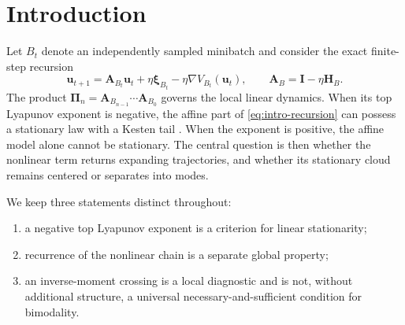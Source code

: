 \documentclass[11pt]{article}
\theoremstyle{definition}
\newcommand{\Id}{\mathbf I}
\newcommand{\uvec}{\mathbf u}
\newcommand{\Avec}{\mathbf A}
\newcommand{\Hvec}{\mathbf H}
\newcommand{\xivec}{\boldsymbol\xi}
\newcommand{\PiProd}{\boldsymbol\Pi}
\begin{document}
\section{Introduction}

Let $B_t$ denote an independently sampled minibatch and consider the exact
finite-step recursion
\begin{equation}
  \uvec_{t+1}
  =\Avec_{B_t}\uvec_t+\eta\xivec_{B_t}
   -\eta\nabla V_{B_t}(\uvec_t),
  \qquad
  \Avec_B=\Id-\eta\Hvec_B.
  \label{eq:intro-recursion}
\end{equation}
The product
$\PiProd_n=\Avec_{B_{n-1}}\cdots\Avec_{B_0}$ governs the local linear
dynamics.  When its top Lyapunov exponent is negative, the affine part of
\eqref{eq:intro-recursion} can possess a stationary law with a Kesten tail
\cite{Kesten1973,Goldie1991}.  When the exponent is positive, the affine model
alone cannot be stationary.  The central question is then whether the
nonlinear term returns expanding trajectories, and whether its stationary
cloud remains centered or separates into modes.

We keep three statements distinct throughout:
\begin{enumerate}[leftmargin=2em]
  \item a negative top Lyapunov exponent is a criterion for linear
  stationarity;
  \item recurrence of the nonlinear chain is a separate global property;
  \item an inverse-moment crossing is a local diagnostic and is not, without
  additional structure, a universal necessary-and-sufficient condition for
  bimodality.
\end{enumerate}
\end{document}
